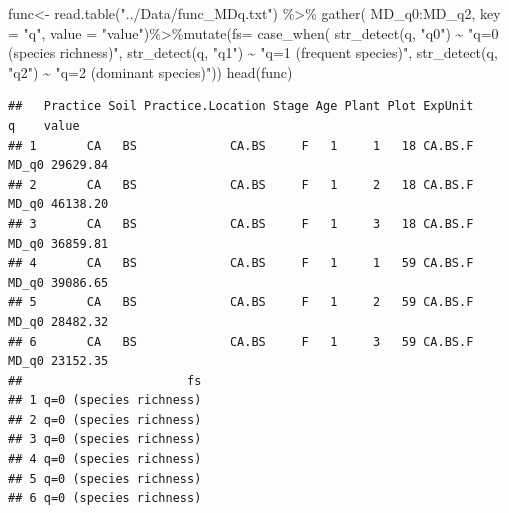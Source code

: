 \documentclass[]{interact}
\theoremstyle{plain}%
\theoremstyle{definition}
\theoremstyle{remark}
\newenvironment{Shaded}{\begin{snugshade}}{\end{snugshade}}
\newcommand{\AttributeTok}[1]{\textcolor[rgb]{0.77,0.63,0.00}{#1}}
\newcommand{\FunctionTok}[1]{\textcolor[rgb]{0.00,0.00,0.00}{#1}}
\newcommand{\NormalTok}[1]{#1}
\newcommand{\OtherTok}[1]{\textcolor[rgb]{0.56,0.35,0.01}{#1}}
\newcommand{\SpecialCharTok}[1]{\textcolor[rgb]{0.00,0.00,0.00}{#1}}
\newcommand{\StringTok}[1]{\textcolor[rgb]{0.31,0.60,0.02}{#1}}
\begin{document}
\begin{Shaded}
\begin{Highlighting}[]
\NormalTok{func}\OtherTok{\textless{}{-}} \FunctionTok{read.table}\NormalTok{(}\StringTok{"../Data/func\_MDq.txt"}\NormalTok{) }\SpecialCharTok{\%\textgreater{}\%} \FunctionTok{gather}\NormalTok{(}
\NormalTok{  MD\_q0}\SpecialCharTok{:}\NormalTok{MD\_q2, }\AttributeTok{key =} \StringTok{"q"}\NormalTok{, }\AttributeTok{value =} \StringTok{"value"}\NormalTok{)}\SpecialCharTok{\%\textgreater{}\%}\FunctionTok{mutate}\NormalTok{(}\AttributeTok{fs=} \FunctionTok{case\_when}\NormalTok{(}
  \FunctionTok{str\_detect}\NormalTok{(q, }\StringTok{"q0"}\NormalTok{) }\SpecialCharTok{\textasciitilde{}} \StringTok{"q=0 (species richness)"}\NormalTok{,}
  \FunctionTok{str\_detect}\NormalTok{(q, }\StringTok{"q1"}\NormalTok{) }\SpecialCharTok{\textasciitilde{}} \StringTok{"q=1 (frequent species)"}\NormalTok{,}
  \FunctionTok{str\_detect}\NormalTok{(q, }\StringTok{"q2"}\NormalTok{) }\SpecialCharTok{\textasciitilde{}} \StringTok{"q=2 (dominant species)"}\NormalTok{))}
\FunctionTok{head}\NormalTok{(func) }
\end{Highlighting}
\end{Shaded}

\begin{verbatim}
##   Practice Soil Practice.Location Stage Age Plant Plot ExpUnit     q    value
## 1       CA   BS             CA.BS     F   1     1   18 CA.BS.F MD_q0 29629.84
## 2       CA   BS             CA.BS     F   1     2   18 CA.BS.F MD_q0 46138.20
## 3       CA   BS             CA.BS     F   1     3   18 CA.BS.F MD_q0 36859.81
## 4       CA   BS             CA.BS     F   1     1   59 CA.BS.F MD_q0 39086.65
## 5       CA   BS             CA.BS     F   1     2   59 CA.BS.F MD_q0 28482.32
## 6       CA   BS             CA.BS     F   1     3   59 CA.BS.F MD_q0 23152.35
##                       fs
## 1 q=0 (species richness)
## 2 q=0 (species richness)
## 3 q=0 (species richness)
## 4 q=0 (species richness)
## 5 q=0 (species richness)
## 6 q=0 (species richness)
\end{verbatim}
\end{document}
